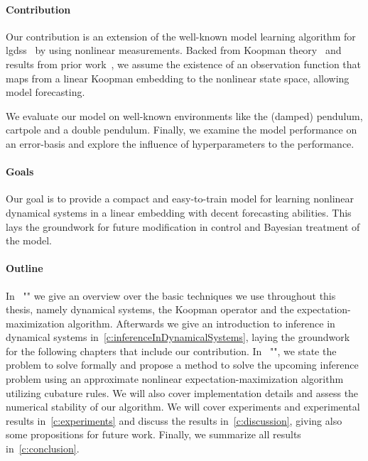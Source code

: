 \paragraph{Contribution}
	Our contribution is an extension of the well-known model learning algorithm for \acp{lgds}~\cite{ghahramaniParameterEstimationLinear1996,minkaHiddenMarkovModels1999} by using nonlinear measurements. Backed from Koopman theory~\cite{koopmanHamiltonianSystemsTransformation1931} and results from prior work~\cite{luschDeepLearningUniversal2018}, we assume the existence of an observation function that maps from a linear Koopman embedding to the nonlinear state space, allowing model forecasting.

	We evaluate our model on well-known environments like the (damped) pendulum, cartpole and a double pendulum. Finally, we examine the model performance on an error-basis and explore the influence of hyperparameters to the performance.

\paragraph{Goals}
	Our goal is to provide a compact and easy-to-train model for learning nonlinear dynamical systems in a linear embedding with decent forecasting abilities. This lays the groundwork for future modification in control and Bayesian treatment of the model.

\paragraph{Outline}
	In \chapterautorefname~"" we give an overview over the basic techniques we use throughout this thesis, namely dynamical systems, the Koopman operator and the expectation-maximization algorithm. Afterwards we give an introduction to inference in dynamical systems in~\autoref{c:inferenceInDynamicalSystems}, laying the groundwork for the following chapters that include our contribution. In \chapterautorefname~"", we state the problem to solve formally and propose a method to solve the upcoming inference problem using an approximate nonlinear expectation-maximization algorithm utilizing cubature rules. We will also cover implementation details and assess the numerical stability of our algorithm. We will cover experiments and experimental results in~\autoref{c:experiments} and discuss the results in~\autoref{c:discussion}, giving also some propositions for future work. Finally, we summarize all results in~\autoref{c:conclusion}.
